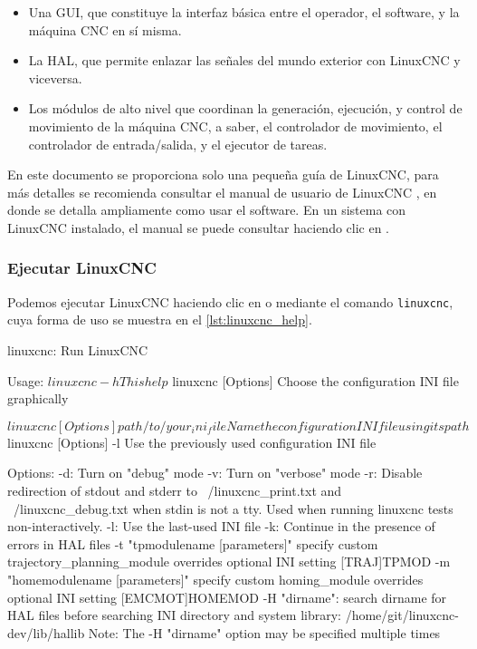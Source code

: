 \documentclass[english,spanish,a4paper,11pt]{article}
\begin{document}
\begin{itemize}
    \item Una \ac{GUI}, que constituye la interfaz básica entre el operador, el software, y la máquina \ac{CNC} en sí misma.
    
    \item La \acf{HAL}, que permite enlazar las señales del mundo exterior con LinuxCNC y viceversa.
    
    \item Los módulos de alto nivel que coordinan la generación, ejecución, y control de movimiento de la máquina \ac{CNC}, a saber, el controlador de movimiento, el controlador de entrada/salida, y el ejecutor de tareas.
\end{itemize}

En este documento se proporciona solo una pequeña guía de LinuxCNC, para más detalles se recomienda consultar el manual de usuario de LinuxCNC \cite{linuxcncdoc}, en donde se detalla ampliamente como usar el software. En un sistema con LinuxCNC instalado, el manual se puede consultar haciendo clic en .


\subsubsection{Ejecutar LinuxCNC}

Podemos ejecutar LinuxCNC haciendo clic en  o mediante el comando \texttt{linuxcnc}, cuya forma de uso se muestra en el \cref{lst:linuxcnc_help}.

\begin{listingtitledbox}[
    title=Uso del comando \texttt{linuxcnc},
    label=lst:linuxcnc_help,
][
    basicstyle=\ttfamily\footnotesize,
]
linuxcnc: Run LinuxCNC

Usage:
  $ linuxcnc -h
    This help

  $ linuxcnc [Options]
    Choose the configuration INI file graphically

  $ linuxcnc [Options] path/to/your_ini_file
    Name the configuration INI file using its path

  $ linuxcnc [Options] -l
    Use the previously used configuration INI file

Options:
    -d: Turn on "debug" mode
    -v: Turn on "verbose" mode
    -r: Disable redirection of stdout and stderr to ~/linuxcnc_print.txt and
        ~/linuxcnc_debug.txt when stdin is not a tty.
        Used when running linuxcnc tests non-interactively.
    -l: Use the last-used INI file
    -k: Continue in the presence of errors in HAL files
    -t "tpmodulename [parameters]"
            specify custom trajectory_planning_module
            overrides optional INI setting [TRAJ]TPMOD
    -m "homemodulename [parameters]"
            specify custom homing_module
            overrides optional INI setting [EMCMOT]HOMEMOD
    -H "dirname": search dirname for HAL files before searching
                  INI directory and system library:
                  /home/git/linuxcnc-dev/lib/hallib
Note:
    The -H "dirname" option may be specified multiple times
\end{listingtitledbox}
\end{document}
